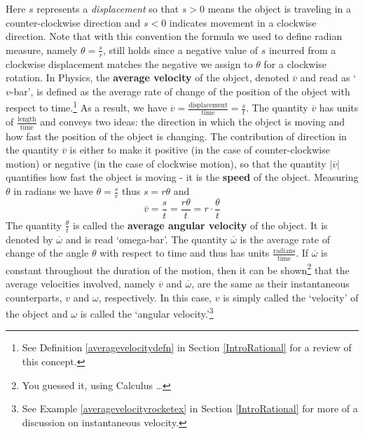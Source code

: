 \documentclass{ximera}
\begin{document}
Here $s$ represents a \textit{displacement} so that  $s > 0$ means the object is traveling in a counter-clockwise direction and $s<0$ indicates movement in a clockwise direction. Note that with this convention the formula we used to define radian measure, namely $\theta = \frac{s}{r}$, still holds since a negative value of $s$ incurred from a clockwise displacement matches the negative we assign to $\theta$ for a clockwise rotation.   In Physics, the \textbf{average velocity}  of the object, denoted $\overline{v}$ and read as `$v$-bar', is defined as the average rate of change of the position of the object with respect to time.\footnote{See Definition \ref{averagevelocitydefn} in Section \ref{IntroRational} for a review of this concept.} As a result, we have $\overline{v} = \frac{\text{displacement}}{\text{time}} = \frac{s}{t}$.  The quantity $\overline{v}$ has units of $\frac{\text{length}}{\text{time}}$ and conveys two ideas:  the direction in which the object is moving and how fast the position of the object is changing.  The contribution of direction in the quantity $\overline{v}$ is either to make it positive (in the case of counter-clockwise motion) or negative (in the case of clockwise motion), so that the quantity $\left| \overline{v} \right|$ quantifies how fast the object is moving - it is the \textbf{speed} of the object. Measuring $\theta$ in radians we have $\theta = \frac{s}{r}$ thus $s = r \theta$ and  \[ \overline{v} = \frac{s}{t} = \frac{r \theta}{t} = r \cdot \frac{\theta}{t} \] The quantity $\frac{\theta}{t}$ is called the \textbf{average angular velocity} of the object.  It is denoted by $\overline{\omega}$ and is read `omega-bar'.  The quantity $\overline{\omega}$ is the average rate of change of the angle $\theta$ with respect to time and thus has units $\frac{\text{radians}}{\text{time}}$. If $\overline{\omega}$ is constant throughout the duration of the motion, then it can be shown\footnote{You guessed it, using Calculus \ldots} that the average  velocities involved, namely $\overline{v}$ and $\overline{\omega}$, are the same as their instantaneous counterparts, $v$ and $\omega$, respectively.  In this case, $v$ is simply called the `velocity' of the object  and  $\omega$ is called the `angular velocity.'\footnote{See Example \ref{averagevelocityrocketex} in Section \ref{IntroRational} for more of a discussion on instantaneous velocity.}  
\end{document}
